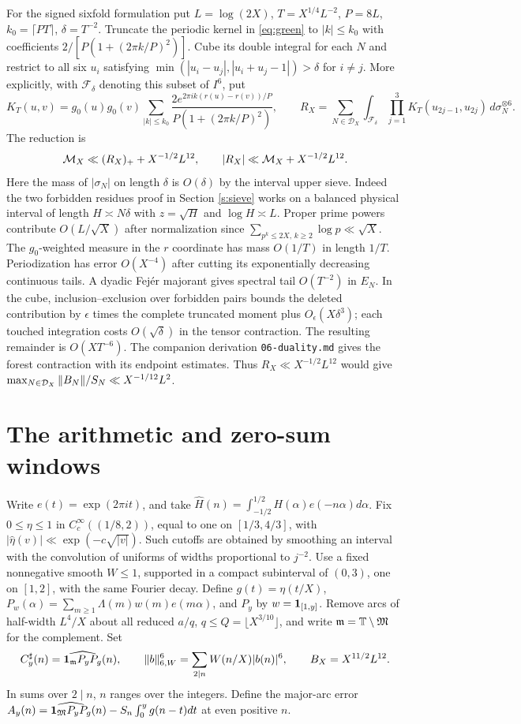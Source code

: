 \documentclass[11pt,a4paper]{article}
\begin{document}
For the signed sixfold formulation put \(L=\log(2X)\), \(T=X^{1/4}L^{-2}\), \(P=8L\), \(k_0=\lceil PT\rceil\), \(\delta=T^{-2}\). Truncate the periodic kernel in \eqref{eq:green} to \(|k|\le k_0\) with coefficients \(2/[P(1+(2\pi k/P)^2)]\). Cube its double integral for each \(N\) and restrict to all six \(u_i\) satisfying \(\min(|u_i-u_j|,|u_i+u_j-1|)>\delta\) for \(i\ne j\). More explicitly, with \(\mathcal F_\delta\) denoting this subset of \(I^6\), put
\[
 K_T(u,v)=g_0(u)g_0(v)\sum_{|k|\le k_0}
  \frac{2 e^{2\pi i k(r(u)-r(v))/P}}{P(1+(2\pi k/P)^2)},\qquad
 R_X=\sum_{N\in\mathcal D_X}\int_{\mathcal F_\delta}
    \prod_{j=1}^3 K_T(u_{2j-1},u_{2j})\,d\sigma_N^{\otimes6}.
\] The reduction is
\[
 {\cal M}_X\ll (R_X)_++X^{-1/2}L^{12},\qquad
 |R_X|\ll {\cal M}_X+X^{-1/2}L^{12}.
\]
Here the mass of \(|\sigma_N|\) on length \(\delta\) is \(O(\delta)\) by the interval upper sieve. Indeed the two forbidden residues proof in Section \ref{s:sieve} works on a balanced physical interval of length \(H\asymp N\delta\) with \(z=\sqrt H\) and \(\log H\asymp L\). Proper prime powers contribute \(O(L/\sqrt X)\) after normalization since \(\sum_{p^k\le2X,\,k\ge2}\log p\ll\sqrt X\). The \(g_0\)-weighted measure in the \(r\) coordinate has mass \(O(1/T)\) in length \(1/T\). Periodization has error \(O(X^{-4})\) after cutting its exponentially decreasing continuous tails. A dyadic Fej\'er majorant gives spectral tail \(O(T^{-2})\) in \(E_N\). In the cube, inclusion--exclusion over forbidden pairs bounds the deleted contribution by \(\epsilon\) times the complete truncated moment plus \(O_\epsilon(X\delta^3)\); each touched integration costs \(O(\sqrt\delta)\) in the tensor contraction. The resulting remainder is \(O(XT^{-6})\). The companion derivation \texttt{06-duality.md} gives the forest contraction with its endpoint estimates. Thus \(R_X\ll X^{-1/2}L^{12}\) would give \(\max_{N\in{\cal D}_X}\|B_N\|/S_N\ll X^{-1/12}L^2\).

\section{The arithmetic and zero-sum windows}\label{s:windows}
Write \(e(t)=\exp(2\pi it)\), and take \(\widehat H(n)=\int_{-1/2}^{1/2}H(\alpha)e(-n\alpha)d\alpha\). Fix \(0\le\eta\le1\) in \(C_c^\infty((1/8,2))\), equal to one on \([1/3,4/3]\), with \(|\widehat\eta(v)|\ll\exp(-c\sqrt{|v|})\). Such cutoffs are obtained by smoothing an interval with the convolution of uniforms of widths proportional to \(j^{-2}\). Use a fixed nonnegative smooth \(W\le1\), supported in a compact subinterval of \((0,3)\), one on \([1,2]\), with the same Fourier decay. Define \(g(t)=\eta(t/X)\), \(P_w(\alpha)=\sum_{m\ge1}\Lambda(m)w(m)e(m\alpha)\), and \(P_y\) by \(w=\mathbf1_{[1,y]}\).
Remove arcs of half-width \(L^4/X\) about all reduced \(a/q\), \(q\le Q=\lfloor X^{3/10}\rfloor\), and write \({\mathfrak m}=\mathbb T\setminus{\mathfrak M}\) for the complement. Set
\[
 C_y^\sharp(n)=\widehat{\mathbf1_{\mathfrak m} P_y P_g}(n),\qquad
 \|b\|_{6,W}^6=\sum_{2\mid n}W(n/X)|b(n)|^6,\qquad B_X=X^{11/2}L^{12}.
\]
In sums over \(2\mid n\), \(n\) ranges over the integers. Define the major-arc error \(A_y(n)=\widehat{\mathbf1_{\mathfrak M} P_yP_g}(n)-S_n\int_0^y g(n-t)dt\) at even positive \(n\).
\end{document}
